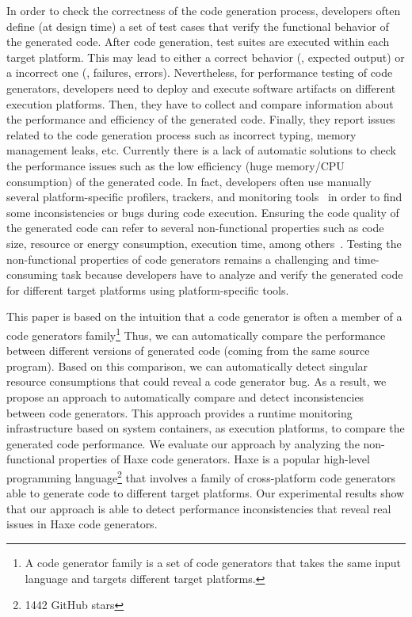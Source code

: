 In order to check the correctness of the code generation process, developers often define (at design time) a set of test cases that verify the functional behavior of the generated code. After code generation, test suites are executed within each target platform. This may lead to either a correct behavior (\ie, expected output) or a incorrect one (\ie, failures, errors).
Nevertheless, for performance testing of code generators, developers need to deploy and execute software artifacts on different execution platforms. Then, they have to collect and compare information about the performance and efficiency of the generated code. Finally, they report issues related to the code generation process such as incorrect typing, memory management leaks, etc. Currently there is a lack of automatic solutions to check the performance issues such as the low efficiency (huge memory/CPU consumption) of the generated code. In fact, developers often use manually several platform-specific profilers, trackers, and monitoring tools~\cite{guana2014chaintracker,delgado2004taxonomy} in order to find some inconsistencies or bugs during code execution. Ensuring the code quality of the generated code can refer to several non-functional properties such as code size, resource or energy consumption, execution time, among others~\cite{pan2006fast}. %
Testing the non-functional properties of code generators remains a challenging and time-consuming task because developers have to analyze and verify the generated code for different target platforms using platform-specific tools.

This paper is based on the intuition that a code generator is often a member of a code generators family\footnote{A code generator family is a set of code generators that takes the same input language and targets different target platforms.} Thus, we can automatically compare the  performance between different versions of generated code (coming from the same source program). Based on this comparison, we can automatically detect singular resource consumptions that could reveal a code generator bug. As a result, we propose an approach to automatically compare and detect inconsistencies between code generators. This approach provides a runtime monitoring infrastructure based on system containers, as execution platforms, to compare the generated code performance. %
We evaluate our approach by analyzing the non-functional properties of Haxe code generators. Haxe is a popular high-level programming language\footnote{\num{1442} GitHub stars} that involves a family of cross-platform code generators able to generate code to different target platforms. Our experimental results show that our approach is able to detect performance inconsistencies that reveal real issues in Haxe code generators.

